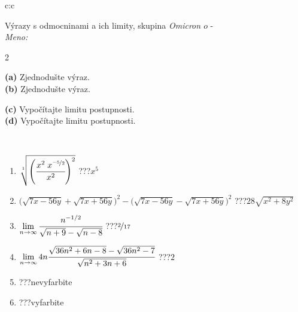 \documentclass[10pt]{report}
\newcommand\omicron{o}
\begin{document}
\begin{tabular}{c:c}
\begin{minipage}[c][104.5mm][t]{0.5\linewidth}
\begin{center}
\vspace{7mm}
{\huge {\Large Výrazy s odmocninami a ich limity}, skupina \textit{Omicron $\omicron$} -}\\[5mm]
\textit{Meno:}\phantom{xxxxxxxxxxxxxxxxxxxxxxxxxxxxxxxxxxxxxxxxxxxxxxxxxxxxxxxxxxxxxxxxx}\\[5mm]
\begin{minipage}{0.95\linewidth}
\begin{center}
{\small \begin{multicols}{2} \raggedright
\phantom{xxxxxxxxx}\textbf{(a)} Zjednodušte výraz. \\[1mm]
\phantom{xxxxxxxxx}\textbf{(b)} Zjednodušte výraz. \par \columnbreak
\textbf{(c)} Vypočítajte limitu postupnosti. \\[1mm]
\textbf{(d)} Vypočítajte limitu postupnosti.
\end{multicols}
}
\end{center}
\end{minipage}
\\[4mm]
\begin{minipage}{0.79\linewidth}
\begin{center}
\begin{varwidth}{\linewidth}
\begin{enumerate}
\small
\item $\sqrt[1]{\left(\cfrac{x^{2}\;x^{\nicefrac{-5}{2}}}{x^{2}}\right)^{2}}$\quad \dotfill\; ???\;\dotfill \quad $x^{5}$
\item {\footnotesize{\scriptsize$\big(\sqrt{7x-56y}+\sqrt{7x+56y}\big)^2-\big(\sqrt{7x-56y}-\sqrt{7x+56y}\big)^2$}\quad \dotfill\; ???\;\dotfill \quad $28\sqrt{x^2+8y^2}$}
\item $\lim\limits_{n\to\infty}\cfrac{n^{-1/2}}{\sqrt{n+9}-\sqrt{n-8}}$\quad \dotfill\; ???\;\dotfill \quad $\nicefrac{2}{17}$
\item $\lim\limits_{n\to\infty}4n\cfrac{\sqrt{36n^2+6n-8}-\sqrt{36n^2-7}}{\sqrt{n^2+3n+6}}$\quad \dotfill\; ???\;\dotfill \quad $2$
\item \quad \dotfill\; ???\;\dotfill \quad nevyfarbite
\item \quad \dotfill\; ???\;\dotfill \quad vyfarbite
\end{enumerate}
\end{varwidth}
\end{center}

\end{minipage}
\end{center}
\end{minipage}
\end{tabular}
\end{document}
